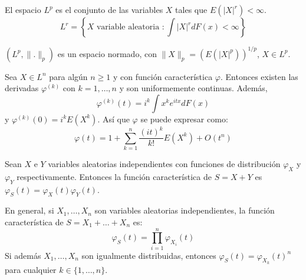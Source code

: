 \begin{definition}
    El espacio $L^p$ es el conjunto de las variables $X$ tales que $E(|X|^r) < \infty$.
    $$L^r = \left\{X \text{ variable aleatoria } : \int |X|^rdF(x) < \infty\right\}$$

    $(L^p, \|.\|_p)$ es un espacio normado, con $\|X\|_p = (E(|X|^p))^{1/p}$, $X \in L^p$.
\end{definition}

\begin{theorem}
    Sea $X \in L^n$ para algún $n \geq 1$ y con función característica $\varphi$.
    Entonces existen las derivadas $\varphi^{(k)}$ con $k = 1, \dots, n$ y son uniformemente continuas.
    Además,
    $$\varphi^{(k)}(t) = i^k \int x^ke^{itx}dF(x)$$
    y $\varphi^{(k)}(0) = i^kE(X^k)$.
    Así que $\varphi$ se puede expresar como:
    $$\varphi(t) = 1 + \sum_{k=1}^n \frac{(it)^k}{k!}E(X^k) + O(t^n)$$
\end{theorem}

\begin{proposition}
    Sean $X$ e $Y$ variables aleatorias independientes con funciones de distribución $\varphi_X$ y $\varphi_Y$ respectivamente.
    Entonces la función característica de $S = X+Y$ es $\varphi_S(t) = \varphi_X(t)\varphi_Y(t)$.
\end{proposition}

En general, si $X_1, \dots, X_n$ son variables aleatorias independientes, la función característica de $S = X_1 + \dots + X_n$ es:
$$\varphi_S(t) = \prod_{i=1}^n \varphi_{X_i}(t)$$
Si además $X_1, \dots, X_n$ son igualmente distribuidas, entonces $\varphi_S(t) = \varphi_{X_k}(t)^n$ para cualquier $k \in \{1, \dots, n\}$.

